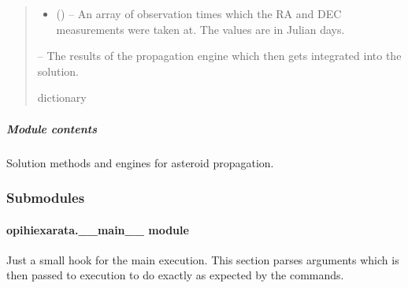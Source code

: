 \documentclass[letterpaper,11pt,english]{sphinxmanual}
\begin{document}
\begin{savenotes}
\begin{fulllineitems}
\begin{quote}
\begin{description}
\begin{itemize}
\item {} 
\sphinxAtStartPar
{} () – An array of observation times which the RA and DEC measurements
were taken at. The values are in Julian days.

\end{itemize}

\sphinxAtStartPar
{} – The results of the propagation engine which then gets integrated into
the solution.

\sphinxAtStartPar
dictionary

\end{description}\end{quote}

\end{fulllineitems}\end{savenotes}



\subparagraph{Module contents}
\label{\detokenize{code/opihiexarata.propagate:module-opihiexarata.propagate}}\label{\detokenize{code/opihiexarata.propagate:module-contents}}
\sphinxAtStartPar
Solution methods and engines for asteroid propagation.


\subsubsection{Submodules}
\label{\detokenize{code/opihiexarata:submodules}}
\sphinxstepscope


\paragraph{opihiexarata.\_\_main\_\_ module}
\label{\detokenize{code/opihiexarata.__main__:module-opihiexarata.__main__}}\label{\detokenize{code/opihiexarata.__main__:opihiexarata-main-module}}\label{\detokenize{code/opihiexarata.__main__::doc}}
\sphinxAtStartPar
Just a small hook for the main execution. This section parses arguments
which is then passed to execution to do exactly as expected by the commands.
\end{document}
